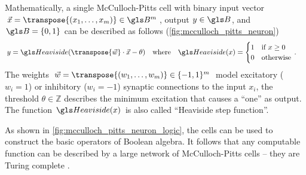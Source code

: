 Mathematically, a single McCulloch-Pitts cell with binary input vector $\vec x = \transpose{(x_1, \ldots, x_m)} \in \B^m$, output $y \in \B$, and $\B = \{0, 1\}$ can be described as follows (\cref{fig:mcculloch_pitts_neuron})
\begin{align}
	y &= \Heaviside(\transpose{\vec w} \cdot \vec x - \theta) & \text{where} \quad 
		\Heaviside(x) &=  \begin{cases}
			1 & \text{if } x \geq 0 \\
			0 & \text{otherwise}
	    \end{cases} \,.
	\label{eqn:mcculloch_pitts_cell}
\end{align}
The weights $\vec w = \transpose{(w_1, \ldots, w_m)} \in \{-1, 1\}^m$ model excitatory ($w_i = 1$) or inhibitory ($w_i = -1$) synaptic connections to the input $x_i$, the threshold $\theta \in \mathbb{Z}$ describes the minimum excitation that causes a \enquote{one} as output. The function $\Heaviside(x)$ is also called \enquote{Heaviside step function}.

As shown in \cref{fig:mcculloch_pitts_neuron_logic}, the cells can be used to construct the basic operators of Boolean algebra. It follows that any computable function can be described by a large network of McCulloch-Pitts cells -- they are Turing complete \cite{copeland1996alan}.

